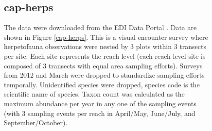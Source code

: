 \documentclass[11pt, oneside]{article}
\begin{document}
\begin{figure}[h!]
\subsection {cap-herps}
The data were downloaded from the EDI Data Portal \citep{cap-herps}.
Data are shown in Figure \ref{cap-herps}.
This is a visual encounter survey where herpetofauna observations were nested by 3 plots within 3 transects per site. 
Each site represents the reach level (each reach level site is composed of 3 transects with equal area sampling efforts). 
Surveys from 2012 and March were dropped to standardize sampling efforts temporally. 
Unidentified species were dropped, species code is the scientific name of species. 
Taxon count was calculated as the maximum abundance per year in any one of the sampling events (with 3 sampling events per reach in April/May, June/July, and September/October). 


\end{figure}
\end{document}
